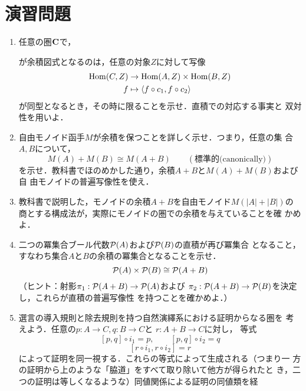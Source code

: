 \section{演習問題}
\begin{enumerate}
 \item 任意の圏${\bf C}$で，
       \begin{center}
       \end{center}
       が余積図式となるのは，任意の対象$Z$に対して写像
       \begin{align*}
	\mathrm{Hom}(C, Z) &\to \mathrm{Hom}(A, Z) \times \mathrm{Hom}(B, Z)\\
	f &\mapsto \langle f \circ c_1, f \circ c_2 \rangle
       \end{align*}
       が同型となるとき，その時に限ることを示せ．直積での対応する事実と
       双対性を用いよ．
 \item 自由モノイド函手$M$が余積を保つことを詳しく示せ．つまり，任意の集
       合$A, B$について，
       \[
	M(A) + M(B) \cong M(A+B) \qquad (\text{標準的(canonically)})
       \]
       を示せ．教科書でほのめかした通り，余積$A+B$と$M(A)+M(B)$および自
       由モノイドの普遍写像性を使え．
 \item 教科書で説明した，モノイドの余積$A+B$を自由モノイド$M(|A|+|B|)$の
       商とする構成法が，実際にモノイドの圏での余積を与えていることを確
       かめよ．
 \item 二つの冪集合ブール代数$\mathcal{P}(A)$および$\mathcal{P}(B)$の直積が再び冪集合
       となること，すなわち集合$A$と$B$の余積の冪集合となることを示せ．
       \[
	\mathcal{P}(A) \times \mathcal{P}(B) \cong \mathcal{P}(A + B)
       \]
       （ヒント：射影$\pi_1: \mathcal{P}(A+B) \to \mathcal{P}(A)$および
       $\pi_2: \mathcal{P}(A+B) \to \mathcal{P}(B)$を決定し，これらが直積の普遍写像性
       を持つことを確かめよ．）
 \item 選言の導入規則と除去規則を持つ自然演繹系における証明からなる圏を
       考えよう．任意の$p: A \to C, q: B \to C $と $r: A+B \to C$に対し，
       等式
       \[
	[p, q] \circ i_1 = p,\qquad [p, q] \circ i_2 = q
       \]
       \[
        [r \circ i_1, r \circ i_2] = r
       \]
       によって証明を同一視する．これらの等式によって生成される（つまり一
       方の証明から上のような「脇道」をすべて取り除いて他方が得られたと
       き，二つの証明は等しくなるような）同値関係による証明の同値類を経

\end{enumerate}
